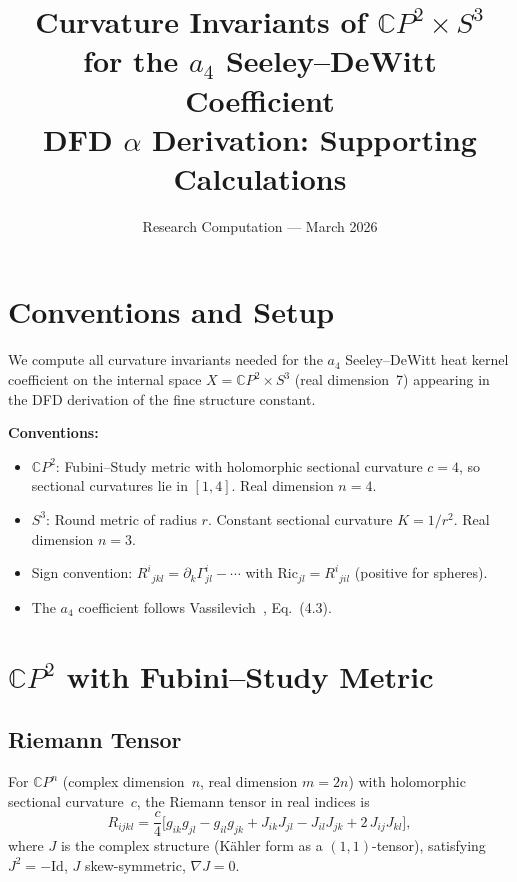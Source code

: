 \documentclass[11pt,a4paper]{article}
\title{Curvature Invariants of $\mathbb{C}P^2 \times S^3$\\
for the $a_4$ Seeley--DeWitt Coefficient\\[6pt]
\large DFD $\alpha$ Derivation: Supporting Calculations}
\author{Research Computation --- March 2026}
\date{}
\begin{document}
\maketitle

\section{Conventions and Setup}

We compute all curvature invariants needed for the $a_4$ Seeley--DeWitt
heat kernel coefficient on the internal space $X = \mathbb{C}P^2 \times S^3$
(real dimension~7) appearing in the DFD derivation of the fine structure
constant.

\medskip\noindent\textbf{Conventions:}
\begin{itemize}
\item $\mathbb{C}P^2$: Fubini--Study metric with holomorphic sectional
  curvature $c = 4$, so sectional curvatures lie in $[1,4]$.
  Real dimension $n = 4$.
\item $S^3$: Round metric of radius $r$. Constant sectional curvature
  $K = 1/r^2$. Real dimension $n = 3$.
\item Sign convention: $R^i{}_{jkl} = \partial_k \Gamma^i_{jl} - \cdots$
  with $\mathrm{Ric}_{jl} = R^i{}_{jil}$ (positive for spheres).
\item The $a_4$ coefficient follows Vassilevich~\cite{Vassilevich2003},
  Eq.~(4.3).
\end{itemize}

\section{$\mathbb{C}P^2$ with Fubini--Study Metric}

\subsection{Riemann Tensor}

For $\mathbb{C}P^n$ (complex dimension~$n$, real dimension $m = 2n$) with
holomorphic sectional curvature~$c$, the Riemann tensor in real indices is
\begin{equation}\label{eq:Riem-CPn}
R_{ijkl} = \frac{c}{4}\bigl[
  g_{ik}g_{jl} - g_{il}g_{jk}
  + J_{ik}J_{jl} - J_{il}J_{jk}
  + 2\,J_{ij}J_{kl}
\bigr],
\end{equation}
where $J$ is the complex structure (K\"ahler form as a $(1,1)$-tensor),
satisfying $J^2 = -\mathrm{Id}$, $J$ skew-symmetric, $\nabla J = 0$.
\end{document}
